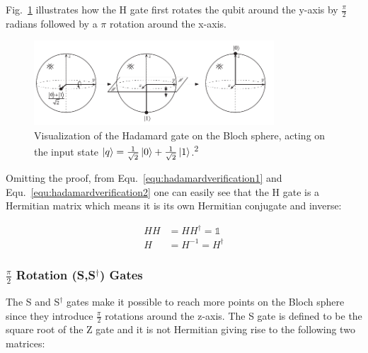 Fig.~\ref{img:blochhgate} illustrates how the H gate first rotates the qubit around the y-axis by $\frac{\pi}{2}$ radians followed by a $\pi$ rotation around the x-axis.

\begin{figure}[ht]
   \centering
   \includegraphics[width=0.8\textwidth]{img/blochhadamardnielsenchuang.png}
   \caption{Visualization of the Hadamard gate on the Bloch sphere, acting on the input state $\ket{q} = \frac{1}{\sqrt{2}} \ket{0} + \frac{1}{\sqrt{2}} \ket{1}$.\textsuperscript{2}}
   \label{img:blochhgate}
\end{figure}



Omitting the proof, from Equ.~\ref{equ:hadamardverification1} and Equ.~\ref{equ:hadamardverification2} one can easily see that the H gate is a Hermitian matrix which means it is its own Hermitian conjugate and inverse:

\begin{align}
HH &= HH^\dagger = \mathbb{1} \\
H &= H^{-1} = H^\dagger
\end{align}

\subsubsection{$\frac{\pi}{2}$ Rotation (S,S$^\dagger$) Gates}
\label{subsubsubsec:cliffordgates}

The S and S$^\dagger$ gates make it possible to reach more points on the Bloch sphere since they introduce $\frac{\pi}{2}$ rotations around the z-axis. The S gate is defined to be the square root of the Z gate and it is not Hermitian giving rise to the following two matrices: 


